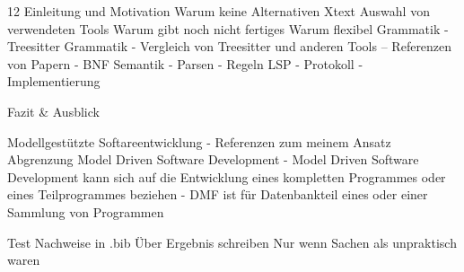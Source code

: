

\normalsize{12}
	Einleitung und Motivation
	Warum keine Alternativen Xtext
	Auswahl von verwendeten Tools
	Warum gibt noch nicht fertiges
	Warum flexibel
	Grammatik
	- Treesitter Grammatik
	- Vergleich von Treesitter und anderen Tools
	-- Referenzen von Papern
	- BNF
    Semantik
    - Parsen
    - Regeln
    LSP
    - Protokoll
    - Implementierung

    Fazit & Ausblick

    Modellgestützte Softareentwicklung
    - Referenzen zum meinem Ansatz
    Abgrenzung Model Driven Software Development
    - Model Driven Software Development kann sich auf die Entwicklung eines kompletten Programmes oder eines Teilprogrammes beziehen
    - DMF ist für Datenbankteil eines oder einer Sammlung von Programmen
    
	Test
	Nachweise in .bib
	Über Ergebnis schreiben
	Nur wenn Sachen als unpraktisch waren
	

